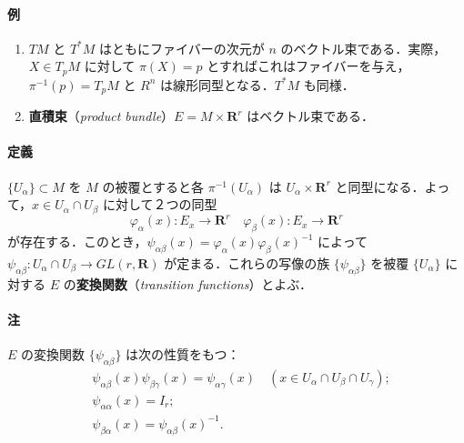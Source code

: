 \documentclass[b5paper,pandoc]{bxjsarticle}
\providecommand{\tightlist}{%
  \setlength{\itemsep}{0pt}\setlength{\parskip}{0pt}}
\let\oldparagraph\paragraph
\renewcommand{\paragraph}[1]{\oldparagraph{#1}\mbox{}}
\begin{document}
\hypertarget{ux4f8b}{%
\paragraph{例}\label{ux4f8b}}

\begin{enumerate}
\def\labelenumi{\roman{enumi})}
\tightlist
\item
  \(TM\) と \(T^*M\) はともにファイバーの次元が \(n\)
  のベクトル束である．実際，\(X \in T_pM\) に対して \(\pi(X) = p\)
  とすればこれはファイバーを与え，\(\pi^{-1}(p) = T_pM\) と \(R^n\)
  は線形同型となる．\(T^*M\) も同様．
\item
  \textbf{直積束}（\emph{product
  bundle}）\(E = M \times \boldsymbol{R}^r\) はベクトル束である．
\end{enumerate}

\hypertarget{ux5b9aux7fa9-1}{%
\paragraph{定義}\label{ux5b9aux7fa9-1}}

\(\{ U_\alpha \} \subset M\) を \(M\) の被覆とすると各
\(\pi^{-1}(U_\alpha)\) は \(U_\alpha \times \boldsymbol{R}^r\)
と同型になる．よって，\(x \in U_\alpha \cap U_\beta\) に対して２つの同型
\[
\varphi_\alpha(x) \colon E_x \to \boldsymbol{R}^r\quad \varphi_\beta(x) \colon E_x \to \boldsymbol{R}^r
\]
が存在する．このとき，\(\psi_{\alpha\beta}(x) = \varphi_\alpha(x) \varphi_\beta(x)^{-1}\)
によって
\(\psi_{\alpha\beta} \colon U_\alpha \cap U_\beta \to GL(r, \boldsymbol{R})\)
が定まる．これらの写像の族 \(\{ \psi_{\alpha\beta} \}\) を被覆
\(\{ U_\alpha \}\) に対する \(E\) の\textbf{変換関数}（\emph{transition
functions}）とよぶ．

\hypertarget{ux6ce8}{%
\paragraph{注}\label{ux6ce8}}

\(E\) の変換関数 \(\{ \psi_{\alpha\beta} \}\) は次の性質をもつ：
\begin{align}
&\psi_{\alpha\beta}(x) \psi_{\beta\gamma}(x) = \psi_{\alpha\gamma}(x)\quad (x \in U_\alpha \cap U_\beta \cap U_\gamma);\\
&\psi_{\alpha\alpha}(x) = I_r;\\
&\psi_{\beta\alpha}(x) = \psi_{\alpha\beta}(x)^{-1}.
\end{align}
\end{document}
